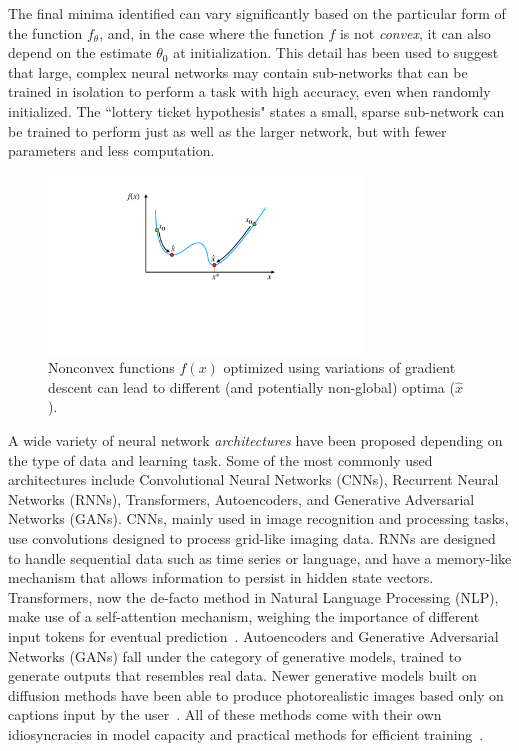 The final minima identified 
can vary significantly based on 
the particular form of the function $f_\theta$, 
and, in the case where the function $f$ is not \textit{convex}, 
it can also depend on the estimate $\theta_0$ at initialization.
This detail has been used to suggest
that large, complex neural networks 
may contain sub-networks that can be trained in isolation
to perform a task with high accuracy,
even when randomly initialized.
The ``lottery ticket hypothesis" states 
a small, sparse sub-network can be trained to perform just as well as the larger network, 
but with fewer parameters and less computation.
\begin{figure}
	\centering
	\includegraphics[width=0.75\textwidth,trim={15cm 15cm 15cm 1cm},clip]{2_bknd/localmin.pdf}
	\caption[Importance of initialization in nonconvex problems]{Nonconvex functions $f(x)$ optimized using variations of gradient descent can lead to different (and potentially non-global) optima ($\hat{x}$).}
	\label{fig:localmin}
\end{figure}

A wide variety of neural network \textit{architectures}
have been proposed depending on the type of data and learning task.
Some of the most commonly used architectures include
Convolutional Neural Networks (CNNs), Recurrent Neural Networks (RNNs),
Transformers, Autoencoders, and Generative Adversarial Networks (GANs).
CNNs, mainly used in image recognition and processing tasks,
use convolutions designed to process grid-like imaging data. 
RNNs are designed to handle sequential data such as time series or language,
and have a memory-like mechanism that allows information to persist in hidden state vectors. 
Transformers, now the de-facto method in Natural Language Processing (NLP),
make use of a self-attention mechanism,
weighing the importance of different input tokens for eventual prediction~\citep{vaswani2017attention}. 
Autoencoders and Generative Adversarial Networks (GANs) fall under the category of generative models,
trained to generate outputs that resembles real data. 
Newer generative models built on diffusion methods have 
been able to produce photorealistic images based
only on captions input by the user~\citep{rombach2022high}.
All of these methods come with their own
idiosyncracies in model capacity and practical
methods for efficient training~\citep{lecun2015deep}.

